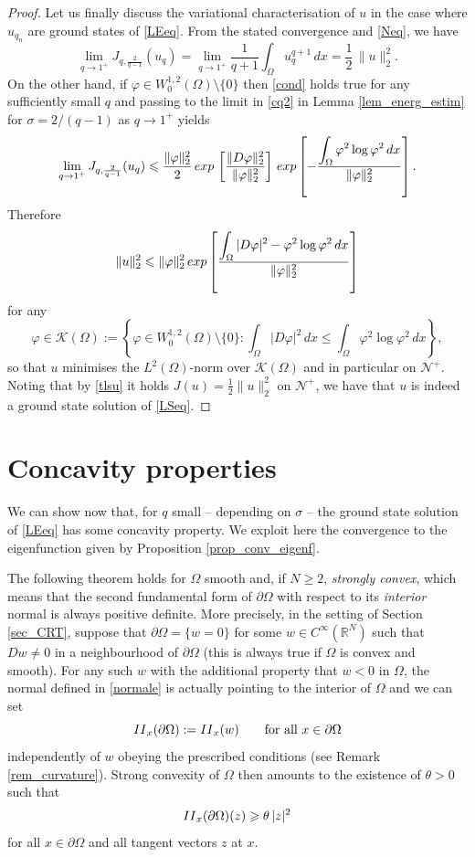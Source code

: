 \documentclass[12pt]{amsart}
\numberwithin{equation}{section}
\theoremstyle{plain}
\theoremstyle{plain}
\theoremstyle{plain}
\theoremstyle{definition}
\newcommand{\R}{{\mathbb R}}
\renewcommand{\le}{\leqslant}
\renewcommand{\ge}{\geqslant}
\begin{document}
\begin{proof}
\smallskip

 Let us finally discuss the variational characterisation of $u$ in the case where $u_{q_n}$ are ground states of \eqref{LEeq}. 
From the stated convergence and \eqref{Neq}, we have
 \[
 \lim_{q\to 1^+} J_{q, \frac{2}{q-1}}(u_q)=\lim_{q\to 1^+} \frac{1}{q+1}\int_\Omega u_{q}^{q+1}\, dx= \frac{1}{2}\, \|u\|_2^2.
 \]
 On the other hand, if $\varphi\in W^{1,2}_0(\Omega)\setminus \{0\}$ then \eqref{cond} holds true for any sufficiently small $q$ and passing to the limit in \eqref{cq2} in Lemma \ref{lem_energ_estim} for $\sigma=2/(q-1)$ as $q\to 1^+$ yields
 \[
 \lim_{q\to 1^+} J_{q, \frac{2}{q-1}}(u_q)\le \frac{\|\varphi\|_2^2}{2} \, {\rm exp}\, \left[\frac{\|D \varphi\|_2^2}{\|\varphi\|_2^2}\right] \, {\rm exp}\left[-\frac{\displaystyle{\int_\Omega \varphi^2\log\varphi^2\, dx}}{\|\varphi\|_2^2}\right].
\]
 Therefore
\[
\|u\|_2^2\le \|\varphi\|_2^2\, {\rm exp} \left[\frac{\displaystyle{\int_\Omega |D \varphi|^2-\varphi^2\log\varphi^2\, dx}}{\|\varphi\|_2^2}\right]
\]
for any
\[
\varphi\in 
{\mathcal K}(\Omega):=\left\{\varphi\in W^{1,2}_0(\Omega)\setminus\{0\}: \int_\Omega |D \varphi|^2\, dx\le \int_\Omega\varphi^2\log\varphi^2\, dx\right\},
\]
so that $u$ minimises the $L^2(\Omega)$-norm over ${\mathcal K}(\Omega)$ and in particular on ${\mathcal N}^+$. Noting that by \eqref{tlsu} it holds $J(u)=\frac{1}{2}\|u\|_2^2$ on ${\mathcal N}^+$, we have that $u$ is indeed a ground state solution of \eqref{LSeq}.
\end{proof}



\section{Concavity properties}
\label{sec_Conc}

We can show now that, for $q$ small -- depending on $\sigma$ -- the ground state solution of \eqref{LEeq} has some concavity property. We exploit here the convergence to the eigenfunction given by Proposition \ref{prop_conv_eigenf}. 

The following theorem holds for $\Omega$ smooth and, if $N\ge 2$, {\em strongly convex}, which means that the second fundamental form of $\partial\Omega$ with respect to its {\em interior} normal is always positive definite. 
More precisely, in the setting of Section \ref{sec_CRT}, suppose that $\partial\Omega=\{w=0\}$ for some $w\in C^\infty(\R^N)$ such that $Dw\ne 0$ in a neighbourhood of $\partial\Omega$ (this is always true if $\Omega$ is convex and smooth). 
For any such $w$ with the additional property that $w<0$ in $\Omega$, the normal defined in \eqref{normale} is actually pointing to the interior of $\Omega$ and we can set
\[
{\rm II}_x(\partial\Omega):={\rm II}_x(w)\qquad \text{for all $x\in \partial\Omega$}
\]
independently of $w$ obeying the prescribed conditions (see Remark \ref{rem_curvature}). 
Strong convexity of $\Omega$ then amounts to the existence of $\theta>0$ such that
\[
{\rm II}_x(\partial\Omega) (z)\ge \theta\, |z|^2
\]
for all $x\in \partial\Omega$ and all tangent vectors $z$ at $x$.
\end{document}
